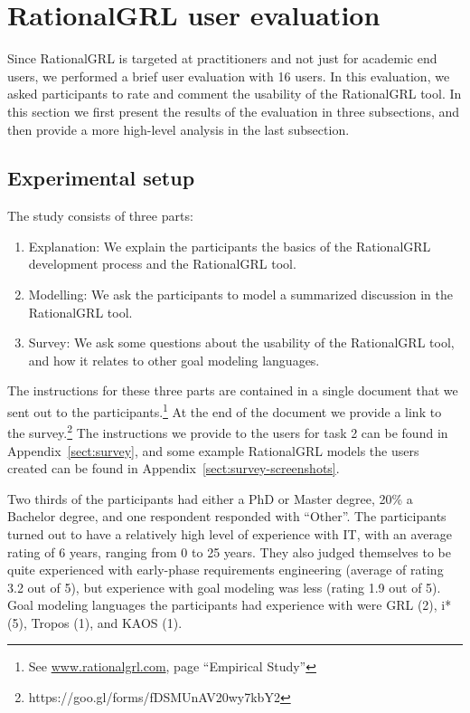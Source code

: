 \section{RationalGRL user evaluation}
\label{sect:validation}

Since RationalGRL is targeted at practitioners and not just for academic end users, we performed a brief user evaluation with 16 users. In this evaluation, we asked participants to rate and comment the usability of the RationalGRL tool. In this section we first present the results of the evaluation in three subsections, and then provide a more high-level analysis in the last subsection.

\subsection{Experimental setup}
The study consists of three parts:
\begin{enumerate}
\item Explanation: We explain the participants the basics of the RationalGRL development process and the RationalGRL tool.
\item Modelling: We ask the participants to model a summarized discussion in the RationalGRL tool.
\item Survey: We ask some questions about the usability of the RationalGRL tool, and how it relates to other goal modeling languages.
\end{enumerate}

The instructions for these three parts are contained in a single document that we sent out to the participants.\footnote{See \url{www.rationalgrl.com}, page ``Empirical Study''} At the end of the document we provide a link to the survey.\footnote{https://goo.gl/forms/fDSMUnAV20wy7kbY2} The instructions we provide to the users for task 2 can be found in Appendix~\ref{sect:survey}, and some example RationalGRL models the users created can be found in Appendix~\ref{sect:survey-screenshots}.

Two thirds of the participants had either a PhD or Master degree, 20\% a Bachelor degree, and one respondent responded with ``Other''. The participants turned out to have a relatively high level of experience with IT, with an average rating of 6 years, ranging from 0 to 25 years. They also judged themselves to be quite experienced with early-phase requirements engineering (average of rating 3.2 out of 5), but experience with goal modeling was less (rating 1.9 out of 5). Goal modeling languages the participants had experience with were GRL (2), i* (5), Tropos (1), and KAOS (1).

